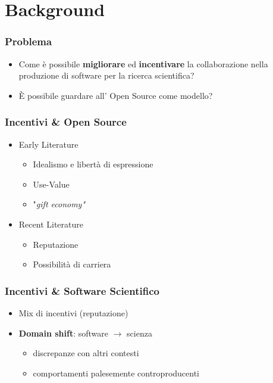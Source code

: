 \section{Background}

\begin{frame}\frametitle{Problema}

\large

\begin{itemize}[<+->]
\item
  Come è possibile \textbf{migliorare} ed \textbf{incentivare} la
  collaborazione nella produzione di software per la ricerca
  scientifica?
\item
  È possibile guardare all' Open Source come modello?
\end{itemize}

\end{frame}

\begin{frame}\frametitle{Incentivi \& Open Source}

\Large

\begin{itemize}[<+->]
\itemsep1pt\parskip0pt
\item
  Early Literature

  \begin{itemize}[<+->]
  \itemsep1pt\parskip0pt
  \item
    Idealismo e libertà di espressione
  \item
    Use-Value
  \item
    "\em{gift economy}"
  \end{itemize}
\item
  Recent Literature

  \begin{itemize}[<+->]
  \itemsep1pt\parskip0pt
  \item
    Reputazione
  \item
    Possibilità di carriera
  \end{itemize}
\end{itemize}

\end{frame}

\begin{frame}\frametitle{Incentivi \& Software Scientifico}

\Large

\begin{itemize}[<+->]
\itemsep1pt\parskip0pt
\item
  Mix di incentivi (reputazione)
\item
  \textbf{Domain shift}: software $\rightarrow$ scienza

  \begin{itemize}[<+->]
  \itemsep1pt\parskip0pt
  \item
    discrepanze con altri contesti
  \item
    comportamenti palesemente controproducenti
  \end{itemize}
\end{itemize}

\end{frame}

